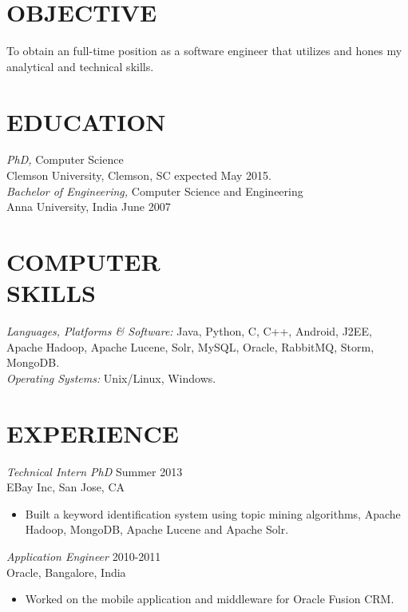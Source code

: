 \documentclass[line,margin]{res}
\begin{document}
\address{813 College Ave, Apt 23, Clemson, SC 29631}
\address{gyanasr@g.clemson.edu $\mid$ gyan404.com $\mid$ (864) 633-9988}

 
\begin{resume}
 
\section{OBJECTIVE}       To obtain an full-time position as a software engineer that utilizes and hones my analytical and technical skills. 
 
\section{EDUCATION} 
{\sl PhD,} Computer Science \\
                Clemson University, Clemson, SC 
                expected May 2015.\\
				{\sl Bachelor of Engineering,} Computer Science and Engineering \\
                Anna University, India 
                June 2007 \\
 
 
\section{COMPUTER \\ SKILLS} {\sl Languages, Platforms \& Software:} Java, Python, C, C++, Android, J2EE, Apache Hadoop, Apache Lucene, Solr, MySQL, Oracle, RabbitMQ, Storm, MongoDB. \\
                {\sl Operating Systems:}  Unix/Linux, Windows.
 
\section{EXPERIENCE} 
{\sl Technical Intern PhD} \hfill Summer 2013\\
                EBay Inc, San Jose, CA
                 \begin{itemize}  \itemsep -2pt %
                 \item Built a keyword identification system using topic mining algorithms, Apache Hadoop, MongoDB, Apache Lucene and Apache Solr.
                \end{itemize}
{\sl Application Engineer} \hfill 2010-2011 \\
               Oracle, 
                Bangalore, India
                 \begin{itemize}  \itemsep -2pt %
                 \item Worked on the mobile application and middleware for
Oracle Fusion CRM. 
                \end{itemize}
 

\end{resume}
\end{document}
